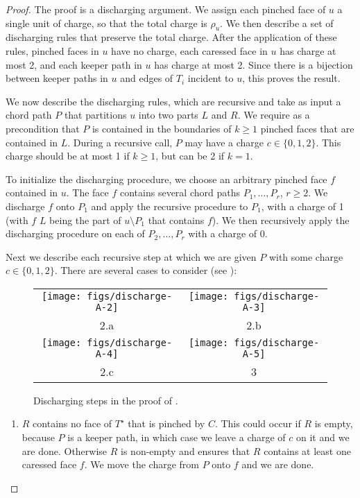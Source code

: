 \documentclass{patmorin}
\newcommand{\dual}[1]{{#1}^\star}
\begin{document}
\begin{proof}
   The proof is a discharging argument.  We assign each pinched face of
   $u$ a single unit of charge, so that the total charge is $\rho_u$.
   We then describe a set of discharging rules that preserve the total
   charge.  After the application of these rules, pinched faces in $u$
   have no charge, each caressed face in $u$ has charge at most 2,
   and each keeper path in $u$ has charge at most 2.  Since there is a
   bijection between keeper paths in $u$ and edges of $T_i$ incident to
   $u$, this proves the result.

   We now describe the discharging rules, which are recursive and take
   as input a chord path $P$ that partitions $u$ into two parts $L$
   and $R$.  We require as a precondition that $P$ is contained in
   the boundaries of $k\ge 1$ pinched faces that are contained in $L$.
   During a recursive call, $P$ may have a charge $c\in\{0,1,2\}$. This
   charge should be at most 1 if $k\ge 1$, but can be 2 if $k=1$.

   To initialize the discharging procedure, we choose an arbitrary
   pinched face $f$ contained in $u$.  The face $f$ contains several
   chord paths $P_1,\ldots,P_r$, $r\ge 2$.  We discharge $f$ onto $P_1$
   and apply the recursive procedure to $P_1$, with a charge of 1 (with
   $f$ $L$ being the part of $u\setminus P_1$ that contains $f$).  We then
   recursively apply the discharging procedure on each of $P_2,\ldots,P_r$
   with a charge of 0.

   Next we describe each recursive step at which we are given $P$ with
	some charge $c\in\{0,1,2\}$.  There are several cases to consider (see ):
	\begin{figure}
		\begin{center}
		\begin{tabular}{cc}
			\texttt{[image: figs/discharge-A-2]} &
			\texttt{[image: figs/discharge-A-3]} \\
			 2.a & 2.b \\[1.5em]
			\texttt{[image: figs/discharge-A-4]} &
			\texttt{[image: figs/discharge-A-5]} \\
			 2.c & 3 
		\end{tabular}
		\end{center}
		\caption{Discharging steps in the proof of .}
	\end{figure}
  \begin{enumerate}
     \item $R$ contains no face of $\dual{T}$ that is pinched by $C$.
     This could occur if $R$ is empty, because $P$ is a keeper path,
     in which case we leave a charge of $c$ on it and we are done.
     Otherwise $R$ is non-empty and   ensures that
     $R$ contains at least one caressed face $f$.  We move the charge
     from $P$ onto $f$ and we are done.


\end{enumerate}
\end{proof}
\end{document}
